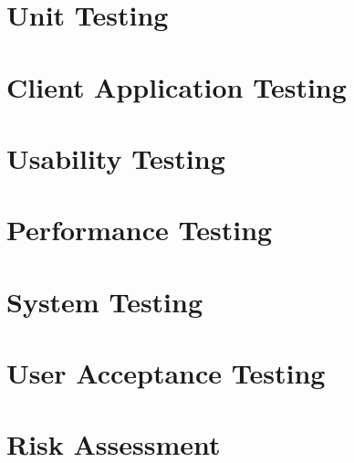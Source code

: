 \section{Unit Testing}
\section{Client Application Testing}
\section{Usability Testing}
\section{Performance Testing}
\section{System Testing}
\section{User Acceptance Testing}
\section{Risk Assessment}